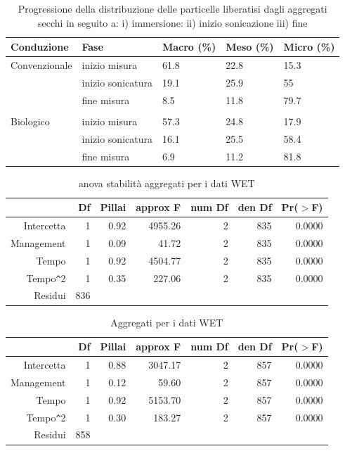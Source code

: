 \documentclass[11pt, a4paper, openright, titlepage, final, language = italian]{book}
\begin{document}
\begin{table}[ht]
\centering
\caption{Progressione della distribuzione delle particelle 
                  liberatisi dagli aggregati secchi in seguito a: 
                  i) immersione:
                  ii) inizio sonicazione 
                  iii) fine  } 
\label{tab:iufd}
\begin{tabular}{lllll}
  \hline
Conduzione & Fase & Macro (\%) & Meso (\%) & Micro (\%) \\ 
  \hline
Convenzionale & inizio misura & 61.8 & 22.8 & 15.3 \\ 
    & inizio sonicatura & 19.1 & 25.9 & 55 \\ 
    & fine misura & 8.5 & 11.8 & 79.7 \\ 
   &  &  &  &  \\ 
  Biologico  & inizio misura & 57.3 & 24.8 & 17.9 \\ 
    & inizio sonicatura & 16.1 & 25.5 & 58.4 \\ 
    & fine misura & 6.9 & 11.2 & 81.8 \\ 
   \hline
\end{tabular}
\end{table}
\begin{table}[ht]
\centering
\caption{anova stabilit\`a aggregati per i dati WET } 
\label{tab:anova_compWET}
\begin{tabular}{rrrrrrr}
  \hline
 & Df & Pillai & approx F & num Df & den Df & Pr($>$F) \\ 
  \hline
Intercetta & 1 & 0.92 & 4955.26 & 2 & 835 & 0.0000 \\ 
  Management & 1 & 0.09 & 41.72 & 2 & 835 & 0.0000 \\ 
  Tempo & 1 & 0.92 & 4504.77 & 2 & 835 & 0.0000 \\ 
  Tempo\verb|^|2 & 1 & 0.35 & 227.06 & 2 & 835 & 0.0000 \\ 
  Residui & 836 &  &  &  &  &  \\ 
   \hline
\end{tabular}
\end{table}


\begin{table}[ht]
\centering
\caption{Aggregati per i dati WET } 
\label{tab:anova_compWET}
\begin{tabular}{rrrrrrr}
  \hline
 & Df & Pillai & approx F & num Df & den Df & Pr($>$F) \\ 
  \hline
Intercetta & 1 & 0.88 & 3047.17 & 2 & 857 & 0.0000 \\ 
  Management & 1 & 0.12 & 59.60 & 2 & 857 & 0.0000 \\ 
  Tempo & 1 & 0.92 & 5153.70 & 2 & 857 & 0.0000 \\ 
  Tempo\verb|^|2 & 1 & 0.30 & 183.27 & 2 & 857 & 0.0000 \\ 
  Residui & 858 &  &  &  &  &  \\ 
   \hline
\end{tabular}
\end{table}
\end{document}
